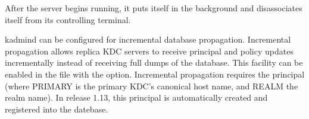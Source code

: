 \documentclass[letterpaper,10pt,english]{sphinxmanual}
\begin{document}
After the server begins running, it puts itself in the background and
disassociates itself from its controlling terminal.

kadmind can be configured for incremental database propagation.
Incremental propagation allows replica KDC servers to receive
principal and policy updates incrementally instead of receiving full
dumps of the database.  This facility can be enabled in the
{\hyperref[\detokenize{admin/conf_files/kdc_conf:kdc-conf-5}]{}} file with the  option.  Incremental
propagation requires the principal  (where
PRIMARY is the primary KDC’s canonical host name, and REALM the realm
name).  In release 1.13, this principal is automatically created and
registered into the datebase.
\end{document}

